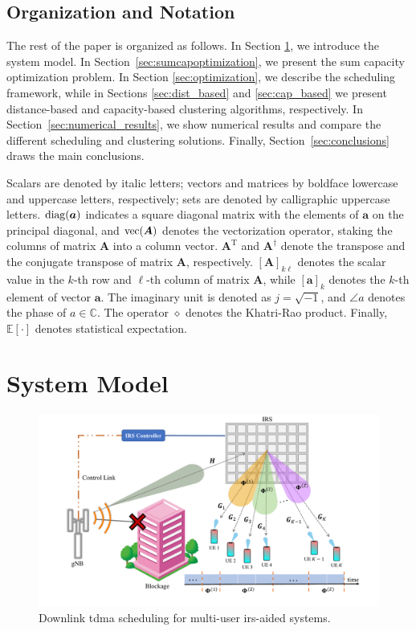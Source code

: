 \subsection{Organization and Notation}
The rest of the paper is organized as follows. In Section \ref{sec:system_model}, we introduce the system model. In Section~\ref{sec:sumcapoptimization}, we present the sum capacity optimization problem. In Section \ref{sec:optimization}, we describe the scheduling framework, while in Sections \ref{sec:dist_based} and \ref{sec:cap_based} we present distance-based and capacity-based clustering algorithms, respectively. In Section~\ref{sec:numerical_results}, we show numerical results and compare the different scheduling and clustering solutions. Finally, Section~\ref{sec:conclusions} draws the main conclusions.

Scalars are denoted by italic letters; vectors and matrices by boldface lowercase and uppercase letters, respectively; sets are denoted by calligraphic uppercase letters.
$\operatorname*{diag}(\bm{a})$ indicates a square diagonal matrix with the elements of $\bm{a}$ on the principal diagonal, and $\operatorname*{vec}(\bm{A})$ denotes the vectorization operator, staking the columns of matrix $\bm{A}$ into a column vector. 
$\bm{A}^{\mathrm T}$ and $\bm{A}^\dagger$ denote the transpose and the conjugate transpose of matrix $\bm{A}$, respectively. 
$[\bm{A}]_{k \ell}$ denotes the scalar value in the $k$-th row and $\ell$-th column of matrix $\bm{A}$, while $[\bm{a}]_k$ denotes the $k$-th element of vector $\bm{a}$. 
The imaginary unit is denoted as $j =\sqrt{-1}$, and $\angle a$ denotes the phase of $a \in \mathbb{C}$. 
The operator $\diamond$ denotes the Khatri-Rao product.
Finally, $\mathbb{E}[\cdot]$ denotes statistical expectation.


\section{System Model}
\label{sec:system_model}

\begin{figure}[t]
    \centering
    \includegraphics[width=\linewidth, trim={2.8cm 0 1.8cm 0},clip]{Figures/IrsClustering/journal_sysmod.pdf}
    \caption{Downlink \gls{tdma} scheduling for multi-user \gls{irs}-aided systems.}
    \label{fig:system_model}
\end{figure}

